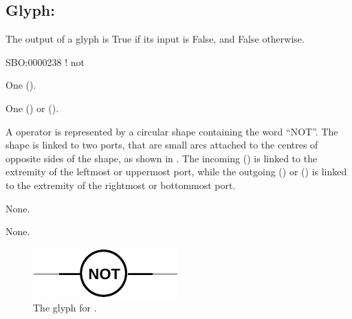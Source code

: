\subsection{Glyph: }\label{sec:not}

The output of a  glyph is True if its input is False, and False otherwise.

\begin{glyphDescription}

\glyphSboTerm
SBO:0000238 ! not

\glyphIncoming One  ().

\glyphOutgoing One  () or  ().

\glyphContainer
A  operator is represented by a circular shape containing the word ``NOT''.
The shape is linked to two ports, that are small arcs attached to the centres of opposite sides of the shape, as shown in .
The incoming  () is linked to the extremity of the leftmost or uppermost port, while the outgoing  () or  () is linked to the extremity of the rightmost or bottommost port.

\glyphLabel
None.

\glyphAux
None.

\end{glyphDescription}

\begin{figure}[H]
  \centering
  \includegraphics{images/build/not.pdf}
  \caption{The \PD glyph for .}
  \label{fig:not}
\end{figure}
